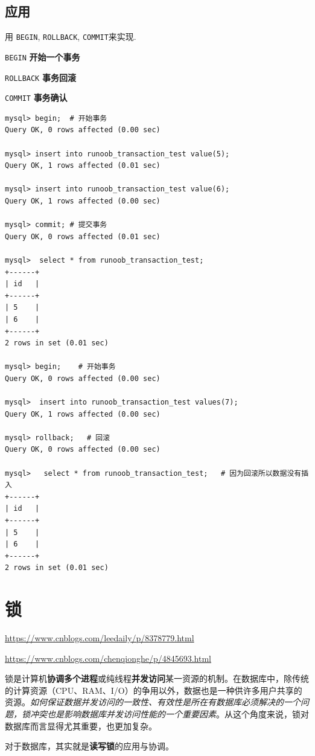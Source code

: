 \documentclass[UTF8,a4paper,12pt]{ctexbook}
\begin{document}
	\section{应用}
		用 \verb|BEGIN|, \verb|ROLLBACK|, \verb|COMMIT|来实现.
		
		\verb|BEGIN| \textbf{开始一个事务}
		
		\verb|ROLLBACK| \textbf{事务回滚}
		
		\verb|COMMIT| \textbf{事务确认}
		
		\begin{lstlisting}
mysql> begin;  # 开始事务
Query OK, 0 rows affected (0.00 sec)
 
mysql> insert into runoob_transaction_test value(5);
Query OK, 1 rows affected (0.01 sec)
 
mysql> insert into runoob_transaction_test value(6);
Query OK, 1 rows affected (0.00 sec)
 
mysql> commit; # 提交事务
Query OK, 0 rows affected (0.01 sec)

mysql>  select * from runoob_transaction_test;
+------+
| id   |
+------+
| 5    |
| 6    |
+------+
2 rows in set (0.01 sec)
 
mysql> begin;    # 开始事务
Query OK, 0 rows affected (0.00 sec)
 
mysql>  insert into runoob_transaction_test values(7);
Query OK, 1 rows affected (0.00 sec)
 
mysql> rollback;   # 回滚
Query OK, 0 rows affected (0.00 sec)
 
mysql>   select * from runoob_transaction_test;   # 因为回滚所以数据没有插入
+------+
| id   |
+------+
| 5    |
| 6    |
+------+
2 rows in set (0.01 sec)		
		\end{lstlisting}

\chapter{锁}
	\url{https://www.cnblogs.com/leedaily/p/8378779.html}
	
	\url{https://www.cnblogs.com/chenqionghe/p/4845693.html}

	锁是计算机\textbf{协调多个进程}或纯线程\textbf{并发访问}某一资源的机制。在数据库中，除传统的计算资源（CPU、RAM、I/O）的争用以外，数据也是一种供许多用户共享的资源。\textit{如何保证数据并发访问的一致性、有效性是所在有数据库必须解决的一个问题，锁冲突也是影响数据库并发访问性能的一个重要因素}。从这个角度来说，锁对数据库而言显得尤其重要，也更加复杂。
	
	
	对于数据库，其实就是\textbf{读写锁}的应用与协调。
	
\end{document}

